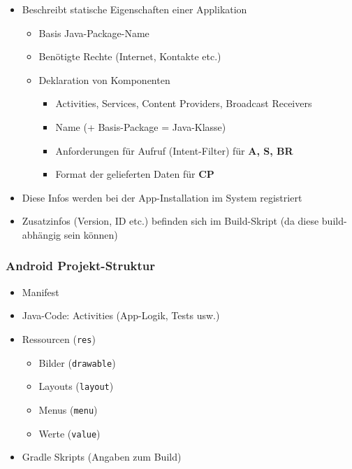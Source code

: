 \documentclass[a4paper]{article}
\begin{document}
			\begin{itemize}
				\item Beschreibt statische Eigenschaften einer Applikation
				\begin{itemize}
					\item Basis Java-Package-Name
					\item Benötigte Rechte (Internet, Kontakte etc.)
					\item Deklaration von Komponenten
					\begin{itemize}
						\item Activities, Services, Content Providers, Broadcast Receivers
						\item Name (+ Basis-Package = Java-Klasse)
						\item Anforderungen für Aufruf (Intent-Filter) für \textbf{A, S, BR}
						\item Format der gelieferten Daten für \textbf{CP}
					\end{itemize}
				\end{itemize}
				\item Diese Infos werden bei der App-Installation im System registriert
				\item Zusatzinfos (Version, ID etc.) befinden sich im Build-Skript (da diese build-abhängig sein können)
			\end{itemize}
		
			\subsubsection{Android Projekt-Struktur}
			
			\begin{itemize}
				\item Manifest
				\item Java-Code: Activities (App-Logik, Tests usw.)
				\item Ressourcen (\texttt{res})
				\begin{itemize}
					\item Bilder (\texttt{drawable})
					\item Layouts (\texttt{layout})
					\item Menus (\texttt{menu})
					\item Werte (\texttt{value})
				\end{itemize}
				\item Gradle Skripts (Angaben zum Build)
			\end{itemize}
		
		\newpage
		
\end{document}
